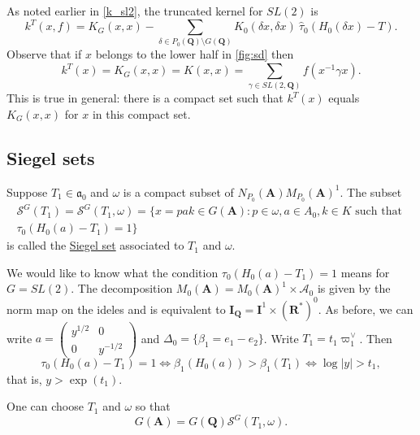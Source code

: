 \documentclass{ims9x6}
\def\A{\mathbf A}
\def\I{\mathbf I}
\def\Q{\mathbf Q}
\def\R{\mathbf R}
\def\AAA{\mathcal A}	%
\def\SSS{\mathcal S}
\def\aaa{\mathfrak a}
\def\bs{\setminus}
\def\mod#1{\lvert #1 \rvert} %
\begin{document}
As noted earlier in \cref{k_sl2}, the truncated kernel for $SL(2)$ is
\begin{equation}
	k^T(x, f) = K_G(x, x) - \sum_{\delta \in P_0(\Q) \bs G(\Q)} K_0(\delta x, \delta x) \ \hat\tau_0(H_0(\delta x) - T).
\end{equation}
Observe that if $x$ belongs to the lower half in \cref{fig:sd} then
\[ k^T(x) = K_G(x, x) = K(x, x) = \sum_{\gamma \in SL(2, \Q)} f(x^{-1}\gamma x). \]
This is true in general: there is a compact set such that $k^T(x)$ equals $K_G(x, x)$ for $x$ in this compact set. 

\subsection{Siegel sets}
Suppose $T_1 \in \aaa_0$ and $\omega$ is a compact subset of $N_{P_0}(\A)M_{P_0}(\A)^1$. The subset 
\begin{multline*}
	\SSS^G(T_1) = \SSS^G(T_1, \omega) = \{ x = pak \in G(\A) : p \in \omega, a \in A_0, k \in K \text{ such that } \\ \tau_0(H_0(a) - T_1) = 1 \}
\end{multline*}
is called the \underline{Siegel set} associated to $T_1$ and $\omega$. 

We would like to know what the condition $\tau_0(H_0(a) - T_1) = 1$ means for $G = SL(2)$. The decomposition $M_0(\A) = M_0(\A)^1 \times \AAA_0$ is given by the norm map on the ideles and is equivalent to $\I_\Q = \I^1 \times (\R^*)^0$. As before, we can write $a = \begin{pmatrix} y^{1/2} & 0 \\ 0 & y^{-1/2} \end{pmatrix}$ and $\Delta_0 = \{\beta_1 = e_1 - e_2\}$. Write $T_1 = t_1 \varpi_1^\vee$. Then
\[	\tau_0(H_0(a) - T_1) = 1 \Leftrightarrow \beta_1(H_0(a)) > \beta_1(T_1) \Leftrightarrow \log \mod{y} > t_1, \]
that is, $y > \exp(t_1)$.
\begin{theorem} \cite[Theorem 6.5]{MR147566}
One can choose $T_1$ and $\omega$ so that 
\[ G(\A) = G(\Q) \SSS^G(T_1, \omega). \]
\end{theorem}
\end{document}
